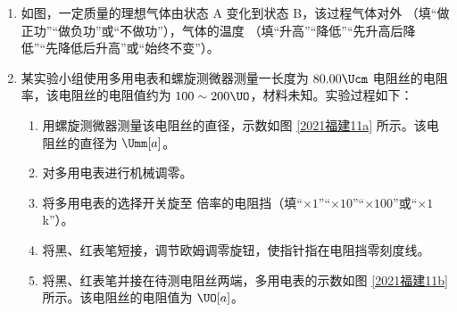 \documentclass[\gkver]{gaokaozhenti}
\begin{document}
\begin{enumerate}


\item
如图，一定质量的理想气体由状态 A 变化到状态 B，该过程气体对外 （填“做正功”“做负功”或“不做功”），气体的温度 （填“升高”“降低”“先升高后降低”“先降低后升高”或“始终不变”）。




\item
某实验小组使用多用电表和螺旋测微器测量一长度为 $80.00 \Ucm$ 电阻丝的电阻率，该电阻丝的电阻值约为 $100\sim200 \UO$，材料未知。实验过程如下：
\begin{enumerate}
	\item
	用螺旋测微器测量该电阻丝的直径，示数如图 \ref{2021福建11a} 所示。该电阻丝的直径为  $\Umm[a]$。
	
	\item
	对多用电表进行机械调零。
	
	\item
	将多用电表的选择开关旋至  倍率的电阻挡（填“$\times1$”“$\times10$”“$\times100$”或“$\times1$ k”）。
	
	\item
	将黑、红表笔短接，调节欧姆调零旋钮，使指针指在电阻挡零刻度线。
	
	\item
	将黑、红表笔并接在待测电阻丝两端，多用电表的示数如图 \ref{2021福建11b} 所示。该电阻丝的电阻值为  $\UO[a]$。
	

\end{enumerate}
\end{enumerate}
\end{document}

